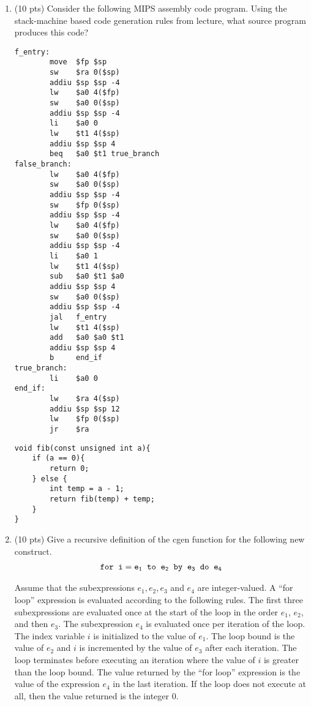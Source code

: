 \documentclass[10pt]{article}
\begin{document}
\begin{enumerate}
\item (10 pts) Consider the following MIPS assembly code program.  Using the
stack-machine based code generation rules from lecture, what source program produces this
code?
\begin{verbatim}
f_entry:
        move  $fp $sp
        sw    $ra 0($sp)
        addiu $sp $sp -4
        lw    $a0 4($fp)
        sw    $a0 0($sp)
        addiu $sp $sp -4
        li    $a0 0
        lw    $t1 4($sp)
        addiu $sp $sp 4
        beq   $a0 $t1 true_branch
false_branch:
        lw    $a0 4($fp)
        sw    $a0 0($sp)
        addiu $sp $sp -4
        sw    $fp 0($sp)
        addiu $sp $sp -4
        lw    $a0 4($fp)
        sw    $a0 0($sp)
        addiu $sp $sp -4
        li    $a0 1
        lw    $t1 4($sp)
        sub   $a0 $t1 $a0
        addiu $sp $sp 4
        sw    $a0 0($sp)
        addiu $sp $sp -4
        jal   f_entry
        lw    $t1 4($sp)
        add   $a0 $a0 $t1
        addiu $sp $sp 4
        b     end_if
true_branch:
        li    $a0 0
end_if:
        lw    $ra 4($sp)
        addiu $sp $sp 12
        lw    $fp 0($sp)
        jr    $ra
\end{verbatim}

\begin{lstlisting}
void fib(const unsigned int a){
    if (a == 0){
        return 0;
    } else {
        int temp = a - 1;
        return fib(temp) + temp;
    }
}
\end{lstlisting}

\pagebreak

\item (10 pts) Give a recursive definition of the cgen function for the following new construct.
\begin{eqnarray*}
\tt{for}\;\; i = e_1 \;\;to\;\; e_2 \;\;\tt{by}\;\; e_3 \;\;\tt{do }\;\; e_4
\end{eqnarray*}

Assume that the subexpressions $e_1, e_2, e_3$ and $e_4$ are
integer-valued. A ``for loop'' expression is evaluated according to
the following rules. The first three subexpressions are evaluated once
at the start of the loop in the order $e_1$, $e_2$, and then $e_3$.
The subexpression $e_4$ is evaluated once per iteration of the loop.
The index variable $i$ is initialized to the value of $e_1$.
The loop bound is the value of $e_2$ and $i$ is incremented by the
value of $e_3$ after each iteration. The loop terminates before
executing an iteration where the value of $i$ is greater than the
loop bound. The value returned by the ``for loop'' expression is the value of the
expression $e_4$ in the last iteration. If the loop does not execute
at all, then the value returned is the integer $0$.


\end{enumerate}
\end{document}
